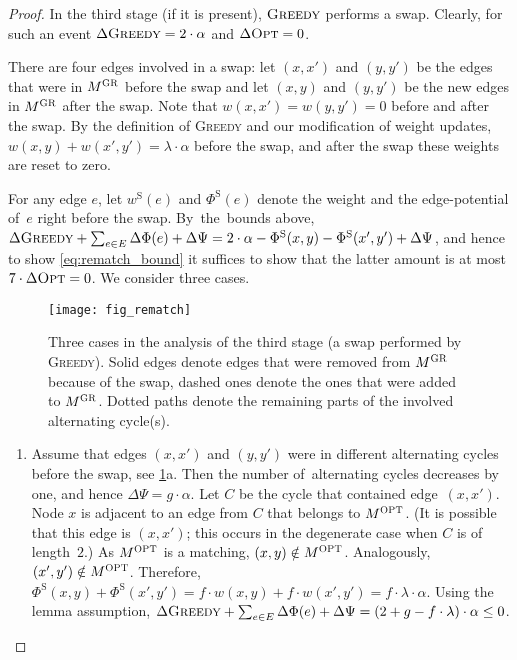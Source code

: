 \documentclass{siamart190516}
\newcommand{\GREEDY}{\textsc{Greedy}\xspace}
\newcommand{\MGREEDY}{M^\textsc{GR}}
\newcommand{\MOPT}{M^\textsc{OPT}}
\newcommand{\OPT}{\textsc{Opt}\xspace}
\newcommand{\Phiinit}{\Phi^\textrm{S}}
\newcommand{\winit}{w^\textrm{S}}
\begin{document}
\begin{proof}
In the third stage (if it is present), $\GREEDY$ performs a swap. Clearly, for
such an event $\Delta \GREEDY = 2 \cdot \alpha$ and $\Delta \OPT = 0$. 

There are four edges involved in a swap: let $(x,x')$ and $(y,y')$ be the
edges that were in $\MGREEDY$ before the swap and let $(x,y)$ and $(y,y')$ be
the new edges in $\MGREEDY$ after the swap. Note that $w(x,x') = w(y,y') = 0$
before and after the swap. By the definition of \GREEDY and our modification
of weight updates, $w(x,y) + w(x',y') = \lambda
\cdot \alpha$ before the swap, and after the swap these weights are reset to
zero.

For any edge $e$, let $\winit(e)$ and $\Phiinit(e)$ denote the weight and the
edge-potential of~$e$ right before the swap. By~the~bounds above, $\Delta
\GREEDY + \sum_{e \in E} \Delta \Phi(e) + \Delta\Psi = 2 \cdot \alpha -
\Phiinit(x,y) - \Phiinit(x',y') + \Delta \Psi$, and hence to show
\eqref{eq:rematch_bound} it suffices to show that the latter amount is at most
$7 \cdot \Delta \OPT = 0$. We consider three cases.

\begin{figure}
\centering
\texttt{[image: fig\_rematch]}
\caption{Three cases in the analysis of the third stage (a swap performed by
\GREEDY). Solid edges denote edges that were removed from $\MGREEDY$ because
of the swap, dashed ones denote the ones that were added to $\MGREEDY$. Dotted
paths denote the remaining parts of the involved alternating cycle(s).}
\label{fig:rematch}
\end{figure}

\begin{enumerate}

\item
Assume that edges $(x,x')$ and $(y,y')$ were in different alternating
cycles before the swap, see \cref{fig:rematch}a. Then the number
of~alternating cycles decreases by one, and hence $\Delta \Psi = g \cdot
\alpha$. Let $C$ be the cycle that contained edge~$(x,x')$. Node $x$ is adjacent
to an edge from $C$ that belongs to $\MOPT$. (It is possible that this edge is
$(x,x')$; this occurs in the degenerate case when $C$ is of length~$2$.) As
$\MOPT$ is a matching, $(x,y) \notin \MOPT$. Analogously, $(x',y') \notin
\MOPT$. Therefore, $\Phiinit(x,y) + \Phiinit(x',y') = f \cdot w(x,y) + f \cdot
w(x',y') = f \cdot \lambda \cdot \alpha$. Using the lemma assumption,
$\Delta \GREEDY + \sum_{e \in E} \Delta \Phi(e) + \Delta\Psi = (2 + g - f
\cdot \lambda) \cdot \alpha \leq 0$.


\end{enumerate}
\end{proof}
\end{document}

